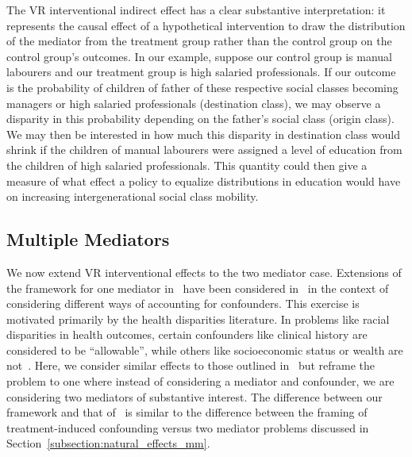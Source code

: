 The VR interventional indirect effect has a clear substantive interpretation: it represents the causal
effect of a hypothetical intervention to draw the distribution of the mediator from the treatment group
rather than the control group on the control group's outcomes. In our example, suppose our control group 
is manual labourers and our treatment group is high salaried professionals. If our 
outcome is the probability of children of father of these respective social classes becoming managers or 
high salaried professionals (destination class), we may observe a disparity in this probability depending 
on the father's social class (origin class). We may then be interested in how much this disparity in 
destination class would shrink if the children of manual labourers were assigned a level of education from
the children of high salaried professionals. This quantity could then give a measure of what effect
a policy to equalize distributions in education would have on increasing 
intergenerational social class mobility. 


\subsection{Multiple Mediators}\label{subsection:vr_effects_2m}


We now extend VR interventional effects to the two mediator case. Extensions of the framework for 
one mediator in~\cite{vanderweelerobinson2014} have been considered in~\cite{jacksonvanderweele2018} 
in the context of considering different ways of accounting for confounders. This exercise is motivated
primarily by the health disparities literature. In problems like racial disparities in health outcomes,
certain confounders like clinical history are considered to be ``allowable'', while others like 
socioeconomic status or wealth are not~\citep{jackson2021}. Here, we consider similar effects to those
outlined in~\cite{jacksonvanderweele2018} but reframe the problem to one where instead of considering a 
mediator and confounder, we are considering two mediators of substantive interest. The difference between
our framework and that of~\cite{jacksonvanderweele2018} is similar to the difference between the framing of
treatment-induced confounding versus two mediator problems discussed in
Section~\ref{subsection:natural_effects_mm}. 


